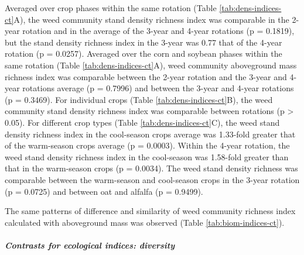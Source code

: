 \documentclass[
]{article}
\begin{document}
Averaged over crop phases within the same rotation (Table \ref{tab:dens-indices-ct}A), the weed community stand density richness index was comparable in the 2-year rotation and in the average of the 3-year and 4-year rotations (p = 0.1819), but the stand density richness index in the 3-year was 0.77 that of the 4-year rotation (p = 0.0257). Averaged over the corn and soybean phases within the same rotation (Table \ref{tab:dens-indices-ct}A), weed community aboveground mass richness index was comparable between the 2-year rotation and the 3-year and 4-year rotations average (p = 0.7996) and between the 3-year and 4-year rotations (p = 0.3469). For individual crops (Table \ref{tab:dens-indices-ct}B), the weed community stand density richness index was comparable between rotations (p \textgreater{} 0.05). For different crop types (Table \ref{tab:dens-indices-ct}C), the weed stand density richness index in the cool-season crops average was 1.33-fold greater that of the warm-season crops average (p = 0.0003). Within the 4-year rotation, the weed stand density richness index in the cool-season was 1.58-fold greater than that in the warm-season crops (p = 0.0034). The weed stand density richness was comparable between the warm-season and cool-season crops in the 3-year rotation (p = 0.0725) and between oat and alfalfa (p = 0.9499).

The same patterns of difference and similarity of weed community richness index calculated with aboveground mass was observed (Table \ref{tab:biom-indices-ct}).

\subparagraph{Contrasts for ecological indices: diversity}\label{contrasts-for-ecological-indices-diversity}
\end{document}
